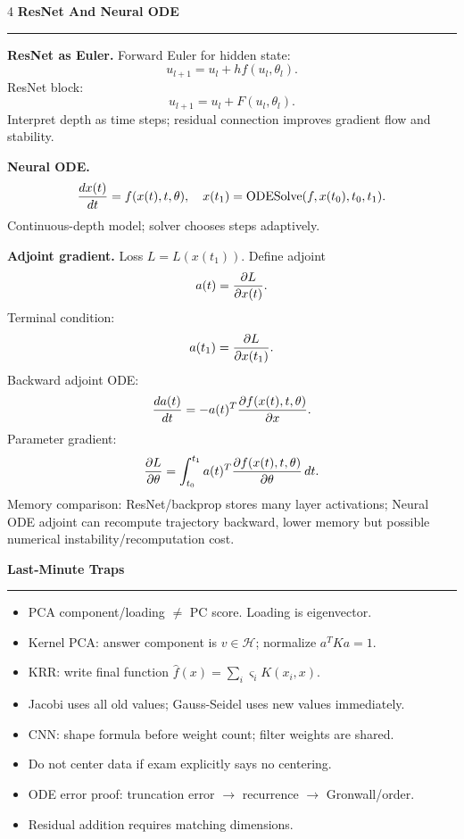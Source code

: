 \documentclass[10pt,a4paper,landscape]{article}
\newcommand{\topic}[1]{\vspace{2pt}\textbf{\large #1}\par\hrule\vspace{2pt}}
\newcommand{\subtopic}[1]{\textbf{#1.}}
\newcommand{\Hcal}{\mathcal H}
\begin{document}
\begin{multicols*}{4}
\topic{ResNet And Neural ODE}
\subtopic{ResNet as Euler}
Forward Euler for hidden state:
\[
u_{l+1}=u_l+h f(u_l,\theta_l).
\]
ResNet block:
\[
u_{l+1}=u_l+F(u_l,\theta_l).
\]
Interpret depth as time steps; residual connection improves gradient flow and stability.

\subtopic{Neural ODE}
\[
{dx(t)\over dt}=f(x(t),t,\theta),\quad
x(t_1)=\operatorname{ODESolve}(f,x(t_0),t_0,t_1).
\]
Continuous-depth model; solver chooses steps adaptively.

\subtopic{Adjoint gradient}
Loss $L=L(x(t_1))$. Define adjoint
\[
a(t)={\partial L\over \partial x(t)}.
\]
Terminal condition:
\[
a(t_1)={\partial L\over \partial x(t_1)}.
\]
Backward adjoint ODE:
\[
{da(t)\over dt}=-a(t)^T{\partial f(x(t),t,\theta)\over \partial x}.
\]
Parameter gradient:
\[
{\partial L\over\partial\theta}
=\int_{t_0}^{t_1}a(t)^T{\partial f(x(t),t,\theta)\over\partial\theta}\,dt.
\]
Memory comparison: ResNet/backprop stores many layer activations; Neural ODE adjoint can recompute trajectory backward, lower memory but possible numerical instability/recomputation cost.

\topic{Last-Minute Traps}
\begin{itemize}
\item PCA component/loading $\ne$ PC score. Loading is eigenvector.
\item Kernel PCA: answer component is $v\in\Hcal$; normalize $a^TKa=1$.
\item KRR: write final function $\hat f(x)=\sum_i\varsigma_iK(x_i,x)$.
\item Jacobi uses all old values; Gauss-Seidel uses new values immediately.
\item CNN: shape formula before weight count; filter weights are shared.
\item Do not center data if exam explicitly says no centering.
\item ODE error proof: truncation error $\to$ recurrence $\to$ Gronwall/order.
\item Residual addition requires matching dimensions.
\end{itemize}

\end{multicols*}
\end{document}
